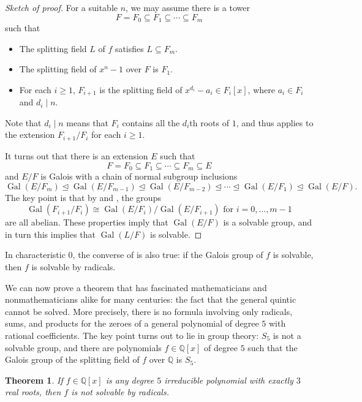 \documentclass[12pt]{report}
\newtheorem{theorem}{Theorem}[chapter]
\numberwithin{equation}{section}
\numberwithin{theorem}{chapter}
\theoremstyle{definition}
\newtheorem*{basic properties}{Basic Properties}
\newtheorem*{Important Remark}{Important Remark}
\DeclareMathOperator{\Gal}{Gal}
\def\nsg{\unlhd}
\begin{document}
\begin{proof}[Sketch of proof]
For a suitable $n$, we may assume there is a tower
$$F = F_0 \subseteq F_1 \subseteq \cdots \subseteq F_m$$
such that 
\begin{itemize}
	\item The splitting field $L$ of $f$ satisfies $L \subseteq F_m$.
	\item The splitting field of $x^n -1$ over $F$ is $F_1$.
	\item For each $i \geqslant 1$, $F_{i+1}$ is the splitting field of $x^{d_i} - a_i \in F_i[x]$, where $a_i \in F_i$ and $d_i \mid n$.  
\end{itemize}

Note that $d_i \mid n$ means that $F_i$ contains all the $d_i$th roots of $1$, and thus  applies to the extension $F_{i+1}/F_i$ for each $i \geqslant 1$.

It turns out that there is an extension $E$ such that 
$$F = F_0 \subseteq F_1 \subseteq \cdots \subseteq F_m \subseteq E$$
and $E/F$ is Galois with a chain of normal subgroup inclusions
$$\Gal(E/F_m) \nsg \Gal(E/F_{m-1}) \nsg \Gal(E/F_{m-2}) \nsg \cdots \nsg\Gal(E/F_{1}) \nsg \Gal(E/F).$$
The key point is that by  and , the groups 
$$\Gal(F_{i+1}/F_i)\cong\Gal(E/F_i)/\Gal(E/F_{i+1}) \text{ for } i = 0, \dots, m-1$$ 
are all abelian. These properties imply that $\Gal(E/F)$ is a solvable group, and in turn this implies that $\Gal(L/F)$ is solvable.
\end{proof}

In characteristic $0$, the converse of  is also true: if the Galois group of $f$ is solvable, then $f$ is solvable by radicals. 


We can now prove a theorem that has fascinated mathematicians and nonmathematicians alike for many centuries: the fact that the general quintic cannot be solved. More precisely, there is no formula involving  only radicals, sums, and products for the zeroes of a general polynomial of degree $5$ with rational coefficients. The key point turns out to lie in group theory: $S_5$ is not a solvable group, and there are polynomials $f \in \mathbb{Q}[x]$ of degree $5$ such that the Galois group of the splitting field of $f$ over $\mathbb{Q}$ is $S_5$.

\begin{theorem}\label{deg 5 not solvable}
If $f \in \mathbb{Q}[x]$ is any degree $5$ irreducible polynomial with exactly $3$ real roots, then $f$ is not solvable by radicals.
\end{theorem}
\end{document}
